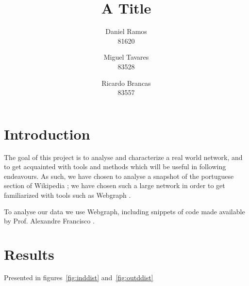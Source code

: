 \documentclass[9pt,a4paper]{article}
\title{A Title}
\author{Daniel Ramos \\ 81620 \and Miguel Tavares \\ 83528 \and Ricardo Brancas  \\ 83557}
\begin{document}
\maketitle

\section{Introduction}
The goal of this project is to analyse and characterize a real world network, and to  get 
acquainted with tools and methods which will be useful in following endeavours.
As such, we have chosen to analyse a snapshot of the portuguese section of Wikipedia \cite{dataset};
we have chosen such a large network in order to get familiarized with tools such as Webgraph \cite{webgraph}.

To analyse our data we use Webgraph, including snippets of code made available
by Prof. Alexandre Francisco \cite{aplf}.


\section{Results}
Presented in figures~\ref{fig:inddist} and~\ref{fig:outddist}
\end{document}
